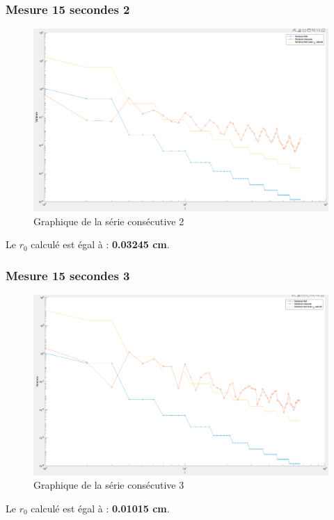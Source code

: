 \subsubsection{Mesure 15 secondes 2}
\begin{figure}[H]
    \centering
    \includegraphics[width = \textwidth]{assets/figures/mesures/mesure_15_sec_2_plot.png}
    \caption{Graphique de la série consécutive 2}
\end{figure}
Le \textbf{$r_0$} calculé est égal à : \textbf{0.03245 cm}.

\subsubsection{Mesure 15 secondes 3}
\begin{figure}[H]
    \centering
    \includegraphics[width = \textwidth]{assets/figures/mesures/mesure_15_sec_3_plot.png}
    \caption{Graphique de la série consécutive 3}
\end{figure}
Le \textbf{$r_0$} calculé est égal à : \textbf{0.01015 cm}.

